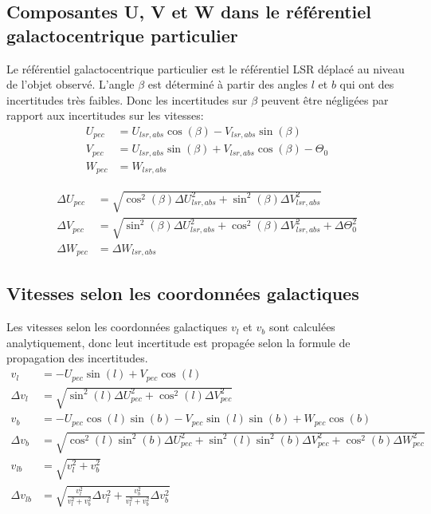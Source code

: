 \documentclass[a4paper, 11pt]{article}
\begin{document}
	\subsection*{Composantes U, V et W dans le référentiel galactocentrique particulier}
	Le référentiel galactocentrique particulier est le référentiel LSR déplacé au niveau de l'objet observé. L'angle $\beta$ est déterminé à partir des angles $l$ et $b$ qui ont des incertitudes très faibles. Donc les incertitudes sur $\beta$ peuvent être négligées par rapport aux incertitudes sur les vitesses:
	\begin{align}
		U_{pec} &= U_{lsr,abs} \cos(\beta) - V_{lsr,abs} \sin(\beta) \\
		V_{pec} &= U_{lsr,abs} \sin(\beta) + V_{lsr,abs} \cos(\beta) - \Theta_0 \\
		W_{pec} &= W_{lsr,abs}
	\end{align}
	
	\begin{align}
		\Delta U_{pec} &= \sqrt{\cos^2(\beta) \Delta U_{lsr,abs}^2 + \sin^2(\beta) \Delta V_{lsr,abs}^2} \\
		\Delta V_{pec} &= \sqrt{\sin^2(\beta) \Delta U_{lsr,abs}^2 + \cos^2(\beta) \Delta V_{lsr,abs}^2 + \Delta\Theta_0^2} \\
		\Delta W_{pec} &= \Delta W_{lsr,abs}
	\end{align}
	
	\subsection*{Vitesses selon les coordonnées galactiques}
	Les vitesses selon les coordonnées galactiques $v_l$ et $v_b$ sont calculées analytiquement, donc leut incertitude est propagée selon la formule de propagation des incertitudes.
	\begin{align}
		v_l &= -U_{pec} \sin(l) + V_{pec} \cos(l) \\
		\Delta v_l &= \sqrt{\sin^2(l) \Delta U_{pec}^2 + \cos^2(l) \Delta V_{pec}^2} \\[1.5em]
		v_b &= -U_{pec} \cos(l) \sin(b) - V_{pec} \sin(l) \sin(b) + W_{pec} \cos(b) \\
		\Delta v_b &= \sqrt{\cos^2(l)\sin^2(b) \Delta U_{pec}^2 + \sin^2(l)\sin^2(b) \Delta V_{pec}^2 + \cos^2(b) \Delta W_{pec}^2} \\[1.5em]
		v_{lb} &= \sqrt{v_l^2 + v_b^2} \\
		\Delta v_{lb} &= \sqrt{\frac{v_l^2}{v_l^2 + v_b^2} \Delta v_l^2 + \frac{v_b^2}{v_l^2 + v_b^2} \Delta v_b^2}
	\end{align}
	
\end{document}
